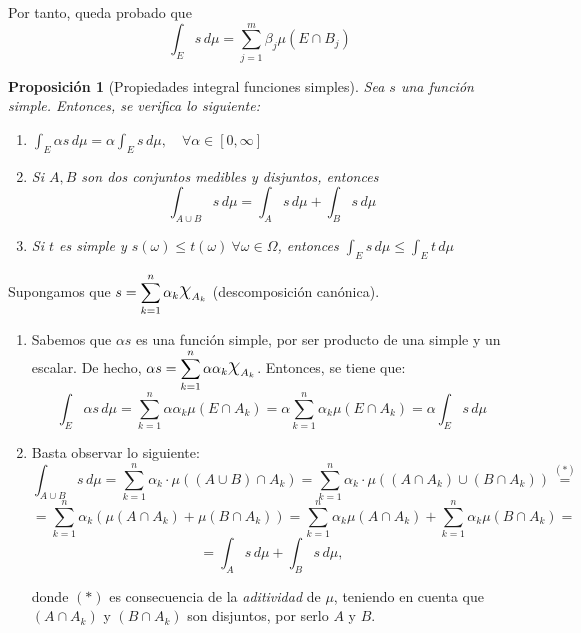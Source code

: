 \documentclass[11pt, a4paper]{article}
\makeatletter
\newif\IfInSansMode
\let\oldsf\sffamily
\renewcommand*{\sffamily}{\oldsf\mathversion{sans}\InSansModetrue}
\let\oldnorm\normalfont
\renewcommand*{\normalfont}{\oldnorm\InSansModefalse\mathversion{normal}}
\DeclareRobustCommand{\rchi}{{\Large \mathpalette\irchi\relax}}
\newcommand{\irchi}[2]{\raisebox{0.4\depth}{$#1\chi$}} %
\newcommand{\W}{\Omega}
\newcommand{\w}{\omega}
\renewenvironment{proof}[1][\proofname] {\par\pushQED{\qed}\normalfont\topsep6\p@\@plus6\p@\relax\trivlist\item[\hskip\labelsep\itshape\sffamily#1\@addpunct{.}]\ignorespaces}{\popQED\endtrivlist\@endpefalse}
\theoremstyle{theorem-style}
\newtheorem{nprop}{Proposición}[section]
\theoremstyle{definition-style}
\theoremstyle{remark-style}
\theoremstyle{example-style}
\newenvironment{nlist}
{\begin{enumerate}
    \renewcommand\labelenumi{(\emph{\roman{enumi})}}}
  {\end{enumerate}}
\makeatother
\begin{document}
Por tanto, queda probado que $$\displaystyle \int_E s\, d\mu = \sum_{j=1}^m \beta_j \mu(E \cap B_j)$$


\begin{nprop}[Propiedades integral funciones simples] \label{int_simples} Sea $s$ una función simple. Entonces, se verifica lo siguiente:
\vspace{0.5em}
    \begin{nlist}
    \item $\displaystyle \int_E \alpha s\, d\mu = \alpha \int_E s\, d\mu, \quad \forall \alpha \in [0,\infty]$
    \item Si $A,B$ son dos conjuntos medibles y disjuntos, entonces $$\int_{A \cup B} s\, d\mu = \int_A s\,d\mu + \int_B s\, d\mu$$
    \item Si $t$ es simple y $\displaystyle s(\omega) \leq t(\omega)\ \forall \w \in \W$, entonces $\displaystyle \int_E s\, d\mu \leq \int_E t\, d\mu$
    \end{nlist}
\end{nprop}

\begin{proof} Supongamos que $\displaystyle s = \sum_{k=1}^n \alpha_k\rchi_{A_k}$ (descomposición canónica).\hfill
    \begin{nlist}
	\item Sabemos que $\alpha s$ es una función simple, por ser producto de una simple y un escalar. De hecho, $\displaystyle \alpha s = \sum_{k=1}^n \alpha \alpha_k \rchi_{A_k}$. Entonces, se tiene que: $$\int_E \alpha s\, d\mu = \sum_{k=1}^n \alpha \alpha_k \mu (E\cap A_k) = \alpha \sum_{k=1}^n \alpha_k \mu (E\cap A_k) = \alpha \int_E s\, d\mu$$
	\item Basta observar lo siguiente: $$\int_{A\cup B} s\, d\mu = \sum_{k=1}^n \alpha_k\cdot \mu((A\cup B)\cap A_k) = \sum_{k=1}^n \alpha_k \cdot \mu((A\cap A_k)\cup (B \cap A_k)) \overset{(*)}{=}$$ $$=\sum_{k=1}^n \alpha_k \left( \mu(A\cap A_k) +  \mu(B \cap A_k)\right) = \sum_{k=1}^n \alpha_k \mu(A\cap A_k) + \sum_{k=1}^n \alpha_k \mu(B\cap A_k) =$$ $$= \int_A s\, d\mu + \int_B s\, d\mu,$$ 
	
	donde $(*)$ es consecuencia de la \textit{aditividad} de $\mu$, teniendo en cuenta que $(A\cap A_k)$ y $(B\cap A_k)$ son disjuntos, por serlo $A$ y $B$.
\end{nlist}
\end{proof}
\end{document}
